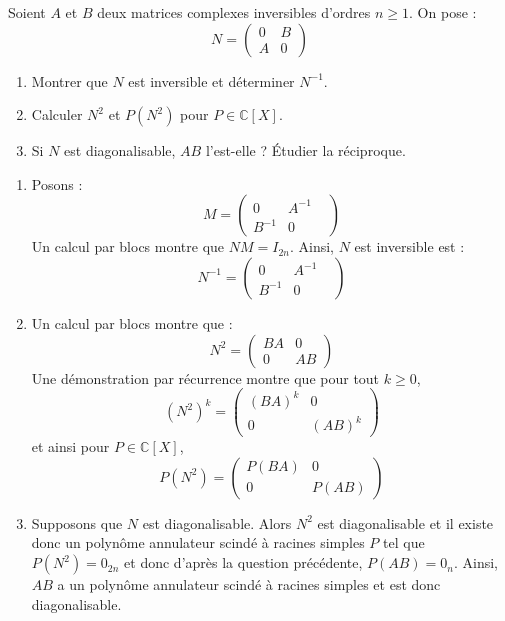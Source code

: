 \documentclass[a4paper,10pt]{report}
\begin{document}
\begin{Exercice}{} Soient $A$ et $B$ deux matrices complexes inversibles d'ordres $n \geq 1$. On pose :
$$ N = \begin{pmatrix}
0 & B \\
A & 0
\end{pmatrix}$$
\begin{enumerate}
\item Montrer que $N$ est inversible et déterminer $N^{-1}$.
\item Calculer $N^2$ et $P(N^2)$ pour $P \in \mathbb{C}[X]$.
\item Si $N$ est diagonalisable, $AB$ l'est-elle ? Étudier la réciproque.
\end{enumerate}
\end{Exercice}

\corr \begin{enumerate}
\item Posons :
$$ M = \begin{pmatrix}
0 & A^{-1} \\
B^{-1} & 0& 
\end{pmatrix}$$
Un calcul par blocs montre que $NM=I_{2n}$. Ainsi, $N$ est inversible est :
$$ N^{-1} = \begin{pmatrix}
0 & A^{-1} \\
B^{-1} & 0& 
\end{pmatrix}$$
\item Un calcul par blocs montre que :
$$ N^{2} = \begin{pmatrix}
BA & 0 \\
0 & AB
\end{pmatrix}$$
Une démonstration par récurrence montre que pour tout $k \geq 0$,
$$ (N^2)^k =  \begin{pmatrix}
(BA)^k & 0 \\
0 & (AB)^k
\end{pmatrix}$$
et ainsi pour $P \in \mathbb{C}[X]$, 
$$ P(N^2) = \begin{pmatrix}
P(BA) & 0 \\
0 & P(AB) 
\end{pmatrix}$$
\item Supposons que $N$ est diagonalisable. Alors $N^2$ est diagonalisable et il existe donc un polynôme annulateur scindé à racines simples $P$ tel que $P(N^2)=0_{2n}$ et donc d'après la question précédente, $P(AB)=0_n$. Ainsi, $AB$ a un polynôme annulateur scindé à racines simples et est donc diagonalisable.

\medskip


\end{enumerate}
\end{document}
